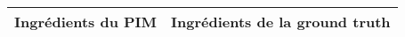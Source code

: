 \begin{tabular}{p{7cm}p{7cm}}
\toprule
                                                                                                                                                                                                                                                                                                                                                                                                                                                                                                                                                                                                                                                                                                                                                                                                                                                                                                                                                                                                                                                                                                                                                                                                                                                                                                                                                                                                                                                                                                                                                                                                                                                                                                  Ingrédients du PIM &                                                                                                                                                                                                                                                                                                                                                                                                                                                                                                                               Ingrédients de la ground truth \\
\midrule

\end{tabular}
